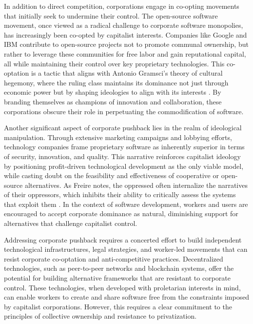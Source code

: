 \begin{refsection}
In addition to direct competition, corporations engage in co-opting movements that initially seek to undermine their control. The open-source software movement, once viewed as a radical challenge to corporate software monopolies, has increasingly been co-opted by capitalist interests. Companies like Google and IBM contribute to open-source projects not to promote communal ownership, but rather to leverage these communities for free labor and gain reputational capital, all while maintaining their control over key proprietary technologies. This co-optation is a tactic that aligns with Antonio Gramsci’s theory of cultural hegemony, where the ruling class maintains its dominance not just through economic power but by shaping ideologies to align with its interests \cite[pp.~245]{gramsci_prison_notebooks_1972}. By branding themselves as champions of innovation and collaboration, these corporations obscure their role in perpetuating the commodification of software.

Another significant aspect of corporate pushback lies in the realm of ideological manipulation. Through extensive marketing campaigns and lobbying efforts, technology companies frame proprietary software as inherently superior in terms of security, innovation, and quality. This narrative reinforces capitalist ideology by positioning profit-driven technological development as the only viable model, while casting doubt on the feasibility and effectiveness of cooperative or open-source alternatives. As Freire notes, the oppressed often internalize the narratives of their oppressors, which inhibits their ability to critically assess the systems that exploit them \cite[pp.~121]{freire_pedagogy_of_oppressed}. In the context of software development, workers and users are encouraged to accept corporate dominance as natural, diminishing support for alternatives that challenge capitalist control.

Addressing corporate pushback requires a concerted effort to build independent technological infrastructures, legal strategies, and worker-led movements that can resist corporate co-optation and anti-competitive practices. Decentralized technologies, such as peer-to-peer networks and blockchain systems, offer the potential for building alternative frameworks that are resistant to corporate control. These technologies, when developed with proletarian interests in mind, can enable workers to create and share software free from the constraints imposed by capitalist corporations. However, this requires a clear commitment to the principles of collective ownership and resistance to privatization.


\end{refsection}
